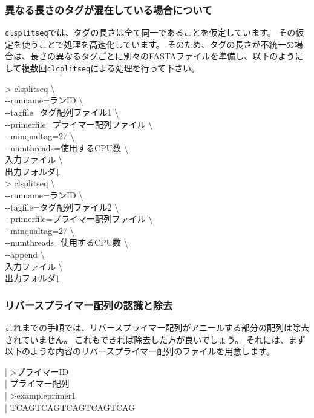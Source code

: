\documentclass[titlepage,10pt,a4paper]{jsbook}
\newenvironment{content}{\begin{shaded}\vspace{-1em}\raggedright\ttfamily\footnotesize\setlength{\baselineskip}{1.4em}}{\end{shaded}\vspace{-1em}}
\newenvironment{cmd}{\begin{oframed}\raggedright\ttfamily\footnotesize\setlength{\baselineskip}{1.4em}}{\end{oframed}\vspace{-1em}}
\begin{document}
\subsubsection{異なる長さのタグが混在している場合について}
\texttt{clsplitseq}では、タグの長さは全て同一であることを仮定しています。
その仮定を使うことで処理を高速化しています。
そのため、タグの長さが不統一の場合は、長さの異なるタグごとに別々のFASTAファイルを準備し、以下のようにして複数回\texttt{clcplitseq}による処理を行って下さい。

\begin{cmd}
{\textgreater} clsplitseq {\textbackslash}\\
{-}{-}runname=ランID {\textbackslash}\\
{-}{-}tagfile=タグ配列ファイル1 {\textbackslash}\\
{-}{-}primerfile=プライマー配列ファイル {\textbackslash}\\
{-}{-}minqualtag=27 {\textbackslash}\\
{-}{-}numthreads=使用するCPU数 {\textbackslash}\\
入力ファイル {\textbackslash}\\
出力フォルダ↓\\
{\textgreater} clsplitseq {\textbackslash}\\
{-}{-}runname=ランID {\textbackslash}\\
{-}{-}tagfile=タグ配列ファイル2 {\textbackslash}\\
{-}{-}primerfile=プライマー配列ファイル {\textbackslash}\\
{-}{-}minqualtag=27 {\textbackslash}\\
{-}{-}numthreads=使用するCPU数 {\textbackslash}\\
{-}{-}append {\textbackslash}\\
入力ファイル {\textbackslash}\\
出力フォルダ↓
\end{cmd}

\subsubsection{リバースプライマー配列の認識と除去}
これまでの手順では、リバースプライマー配列がアニールする部分の配列は除去されていません。
これもできれば除去した方が良いでしょう。
それには、まず以下のような内容のリバースプライマー配列のファイルを用意します。

\begin{content}
| {\textgreater}プライマーID\\
| プライマー配列\\
| {\textgreater}exampleprimer1\\
| TCAGTCAGTCAGTCAGTCAG
\end{content}
\end{document}
